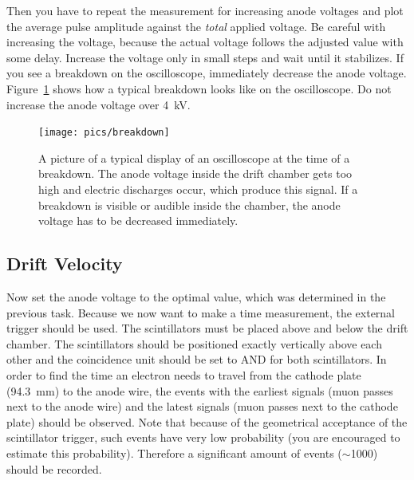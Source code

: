 \documentclass[12pt]{article}
\begin{document}

Then you have to repeat the measurement for increasing anode voltages and plot the average pulse amplitude against the \emph{total} applied voltage. Be careful with increasing the voltage, because the actual voltage follows the adjusted value with some delay. Increase the voltage only in small steps and wait until it stabilizes. If you see a breakdown on the oscilloscope, immediately decrease the anode voltage. Figure~\ref{fig:breakdown} shows how a typical breakdown looks like on the oscilloscope. Do not increase the anode voltage over \SI{4}{\kilo\volt}. 

\begin{figure}[h]
\texttt{[image: pics/breakdown]}
\centering
\caption{A picture of a typical display of an oscilloscope at the time of a breakdown. The anode voltage inside the drift chamber gets too high and electric discharges occur, which produce this signal. If a breakdown is visible or audible inside the chamber, the anode voltage has to be decreased immediately.}
\label{fig:breakdown}
\end{figure}

\subsection{Drift Velocity}
Now set the anode voltage to the optimal value, which was determined in the previous task. Because we now want to make a time measurement, the external trigger should be used. The scintillators must be placed above and below the drift chamber. The scintillators should be positioned exactly vertically above each other and the coincidence unit should be set to AND for both scintillators. In order to find the time an electron needs to travel from the cathode plate (\SI{94.3}{\milli\meter}) to the anode wire, the events with the earliest signals (muon passes next to the anode wire) and the latest signals (muon passes next to the cathode plate) should be observed. Note that because of the geometrical acceptance of the scintillator trigger, such events have very low probability (you are encouraged to estimate this probability). Therefore a significant amount of events ($\sim$1000) should be recorded.
\end{document}
